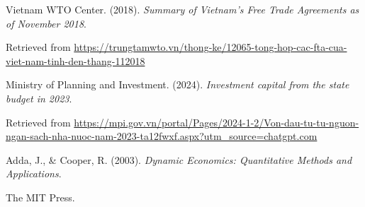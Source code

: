 \documentclass{article}
\begin{document}
\vspace{1em}

Vietnam WTO Center. (2018). \textit{Summary of Vietnam's Free Trade Agreements as of November 2018}.  

Retrieved from \url{https://trungtamwto.vn/thong-ke/12065-tong-hop-cac-fta-cua-viet-nam-tinh-den-thang-112018}

\vspace{1em}

Ministry of Planning and Investment. (2024). \textit{Investment capital from the state budget in 2023}.  

Retrieved from \url{https://mpi.gov.vn/portal/Pages/2024-1-2/Von-dau-tu-tu-nguon-ngan-sach-nha-nuoc-nam-2023-ta12fwxf.aspx?utm_source=chatgpt.com}

\vspace{1em}

Adda, J., \& Cooper, R. (2003). \textit{Dynamic Economics: Quantitative Methods and Applications}.  

The MIT Press.
\end{document}
